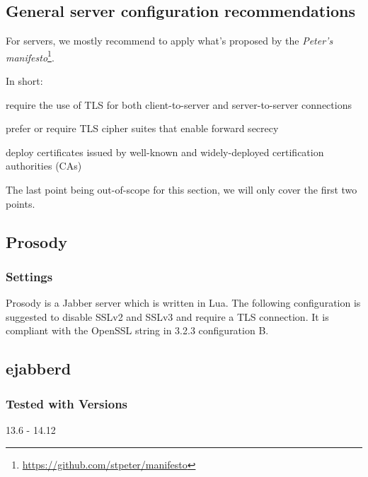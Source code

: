 \gdef\currentsectionname{IM}
\subsection{General server configuration recommendations}

For servers, we mostly recommend to apply what's proposed by the \emph{Peter's manifesto}\footnote{\url{https://github.com/stpeter/manifesto}}.

In short:
\begin{itemize*}
    \item require the use of TLS for both client-to-server and server-to-server connections
    \item prefer or require TLS cipher suites that enable forward secrecy
    \item deploy certificates issued by well-known and widely-deployed certification authorities (CAs)
\end{itemize*}

The last point being out-of-scope for this section, we will only cover the first two points.


\subsection{Prosody}
\subsubsection{Settings}
Prosody is a Jabber server which is written in Lua. 
The following configuration is suggested to disable SSLv2 and SSLv3 and require a TLS connection. It is compliant with the OpenSSL string in 3.2.3 configuration B.




\subsection{ejabberd}

\subsubsection{Tested with Versions}
\begin{itemize*}
  \item 13.6 - 14.12
\end{itemize*}

